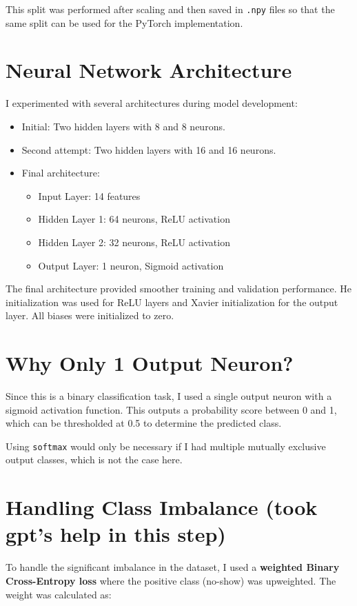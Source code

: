 \documentclass[12pt]{article}
\begin{document}
This split was performed after scaling and then saved in \texttt{.npy} files so that the same split can be used for the PyTorch implementation.

\section*{Neural Network Architecture}
I experimented with several architectures during model development:

\begin{itemize}
    \item Initial: Two hidden layers with 8 and 8 neurons.
    \item Second attempt: Two hidden layers with 16 and 16 neurons.
    \item Final architecture: 
    \begin{itemize}
        \item Input Layer: 14 features
        \item Hidden Layer 1: 64 neurons, ReLU activation
        \item Hidden Layer 2: 32 neurons, ReLU activation
        \item Output Layer: 1 neuron, Sigmoid activation
    \end{itemize}
\end{itemize}

The final architecture provided smoother training and validation performance. He initialization was used for ReLU layers and Xavier initialization for the output layer. All biases were initialized to zero.

\section*{Why Only 1 Output Neuron?}
Since this is a binary classification task, I used a single output neuron with a sigmoid activation function. This outputs a probability score between 0 and 1, which can be thresholded at 0.5 to determine the predicted class.

Using \texttt{softmax} would only be necessary if I had multiple mutually exclusive output classes, which is not the case here.

\section*{Handling Class Imbalance (took gpt's help in this step)}
To handle the significant imbalance in the dataset, I used a \textbf{weighted Binary Cross-Entropy loss} where the positive class (no-show) was upweighted. The weight was calculated as:
\end{document}
